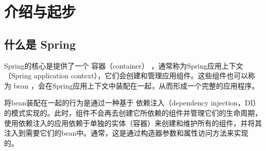 \section{介绍与起步}

\subsection{什么是 Spring}

Spring的核心是提供了一个 容器（container） ，通常称为Spring应用上下文（Spring application context），它们会创建和管理应用组件。这些组件也可以称为 bean ，会在Spring应用上下文中装配在一起，从而形成一个完整的应用程序。

将bean装配在一起的行为是通过一种基于 依赖注入（dependency injection，DI） 的模式实现的。此时，组件不会再去创建它所依赖的组件并管理它们的生命周期，使用依赖注入的应用依赖于单独的实体（容器）来创建和维护所有的组件，并将其注入到需要它们的bean中。通常，这是通过构造器参数和属性访问方法来实现的。